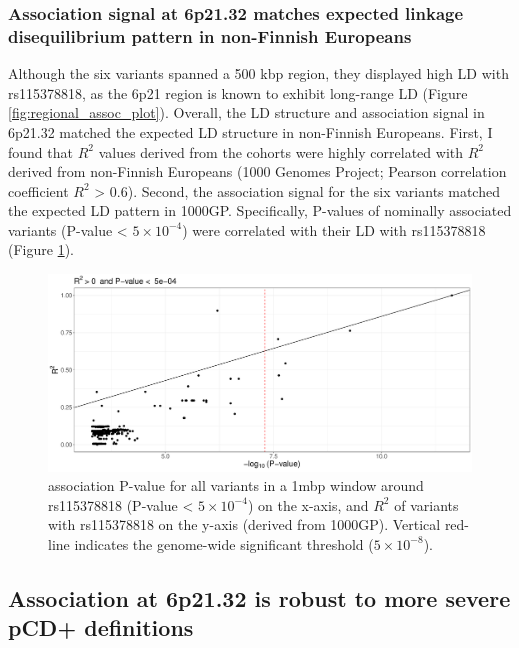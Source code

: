     \subsubsection{Association signal at 6p21.32 matches expected linkage disequilibrium pattern in non-Finnish Europeans}
    Although the six variants spanned a 500 kbp region, they displayed high LD with rs115378818, as the 6p21 region is known to exhibit long-range LD (Figure \ref{fig:regional_assoc_plot}). Overall, the LD structure and association signal in 6p21.32 matched the expected LD structure in non-Finnish Europeans. First, I found that $R^2$ values derived from the cohorts were highly correlated with $R^2$ derived from non-Finnish Europeans (1000 Genomes Project; Pearson correlation coefficient $R^2$ > 0.6). Second, the association signal for the six variants matched the expected LD pattern in 1000GP. Specifically, P-values of nominally associated variants (P-value < $5\times10^{-4}$) were correlated with their LD with rs115378818 (Figure \ref{fig:ld_pval_plot}).




    \begin{figure}[H] 
      \centering    
      \includegraphics[width=1.0\textwidth]{fig3}
      \caption[Figure]{association P-value for all variants in a 1mbp window around rs115378818 (P-value < $5\times10^{-4}$) on the x-axis, and $R^{2}$ of variants with rs115378818 on the y-axis (derived from 1000GP). Vertical red-line indicates the genome-wide significant threshold ($5\times10^{-8}$).}
      \label{fig:ld_pval_plot}
      \end{figure}


    \subsection{Association at 6p21.32 is robust to more severe pCD+ definitions}

